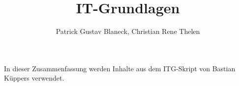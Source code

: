 \documentclass[german]{spicker}
\title{IT-Grundlagen}
\author{Patrick Gustav Blaneck, Christian Rene Thelen}
\begin{document}
\maketitle
In dieser Zusammenfassung werden Inhalte aus dem ITG-Skript von Bastian Küppers \cite{Küppers2022} verwendet.
\tableofcontents
\newpage









\printindex
\printindex[Beispiele]

\printbibliography
\end{document}
